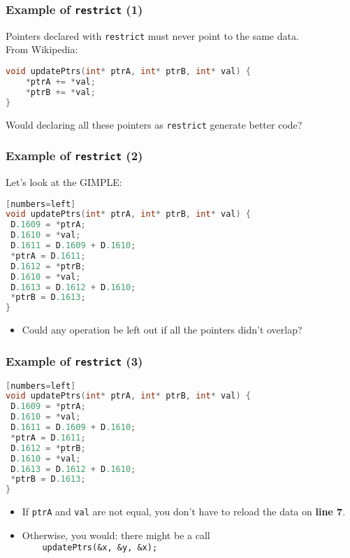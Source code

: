 \begin{frame}[fragile]
  \frametitle{Example of {\tt restrict} (1)}

  
    Pointers declared with {\tt restrict} must
       never point to the same data.
~\\[1em]
    From Wikipedia:

  \begin{lstlisting}[language=C]
void updatePtrs(int* ptrA, int* ptrB, int* val) {
    *ptrA += *val;
    *ptrB += *val;
}
  \end{lstlisting}
 Would declaring all these pointers as
      {\tt restrict} generate better code?
  

\end{frame}

\begin{frame}[fragile]
  \frametitle{Example of {\tt restrict} (2)}

  
    Let's look at the GIMPLE:

  \begin{lstlisting}[language=C][numbers=left]
void updatePtrs(int* ptrA, int* ptrB, int* val) {
 D.1609 = *ptrA;
 D.1610 = *val;
 D.1611 = D.1609 + D.1610;
 *ptrA = D.1611;
 D.1612 = *ptrB;
 D.1610 = *val;
 D.1613 = D.1612 + D.1610;
 *ptrB = D.1613;
}
  \end{lstlisting}

  \begin{itemize}
    \item Could any operation be left out if all the pointers
      didn't overlap?
  \end{itemize}  
  

\end{frame}

\begin{frame}[fragile]
  \frametitle{Example of {\tt restrict} (3)}

  
  \begin{lstlisting}[language=C][numbers=left]
void updatePtrs(int* ptrA, int* ptrB, int* val) {
 D.1609 = *ptrA;
 D.1610 = *val;
 D.1611 = D.1609 + D.1610;
 *ptrA = D.1611;
 D.1612 = *ptrB;
 D.1610 = *val;
 D.1613 = D.1612 + D.1610;
 *ptrB = D.1613;
}
  \end{lstlisting}
  \begin{itemize}
    \item If {\tt ptrA} and {\tt val} are not equal, you don't have to
      reload the data on {\bf line 7}.
    \item Otherwise, you would: there might be a call\\{\tt ~~~~updatePtrs(\&x, \&y,
      \&x);}
  \end{itemize}
  
\end{frame}

